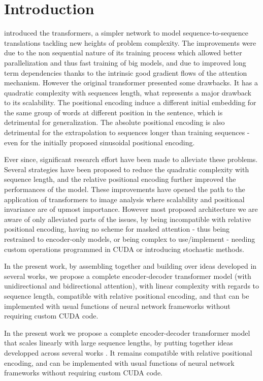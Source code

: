 \section{\label{sec:introduction}Introduction}

\citet{vaswani2017attention} introduced the transformers, a simpler network to model sequence-to-sequence translations tackling new heights of problem complexity. The improvements were due to the non sequential nature of its training process which allowed better parallelization and thus fast training of big models, and due to improved long term dependencies thanks to the intrinsic good gradient flows of the attention mechanism. However the original transformer presented some drawbacks. It has a quadratic complexity with sequences length, what represents a major drawback to its scalability. The positional encoding induce a different initial embedding for the same group of words at different position in the sentence, which is detrimental for generalization. The absolute positional encoding is also detrimental for the extrapolation to sequences longer than training sequences - even for the initially proposed sinusoidal positional encoding.

Ever since, significant research effort have been made to alleviate these problems. Several strategies have been proposed to reduce the quadratic complexity with sequence length, and the relative positional encoding further improved the performances of the model. These improvements have opened the path to the application of transformers to image analysis where scalability and positional invariance are of upmost importance. However most proposed architecture we are aware of only alleviated parts of the issues, by being incompatible with relative positional encoding, having no scheme for masked attention - thus being restrained to encoder-only models, or being complex to use/implement - needing custom operations programmed in CUDA or introducing stochastic methods.

In the present work, by assembling together and building over ideas developed in several works, we propose a complete encoder-decoder transformer model (with unidirectional and bidirectional attention), with linear complexity with regards to sequence length, compatible with relative positional encoding, and that can be implemented with usual functions of neural network frameworks without requiring custom CUDA code.

In the present work we propose a complete encoder-decoder transformer model that scales linearly with large sequence lengths, by putting together ideas developped across several works \cite{vaswani2017attention,shen2020efficient,katharopoulos2020transformers,choromanski2021rethinking,shaw2018selfattention,horn2021translational}. It remains compatible with relative positional encoding, and can be implemented with usual functions of neural network frameworks without requiring custom CUDA code.

\endinput
